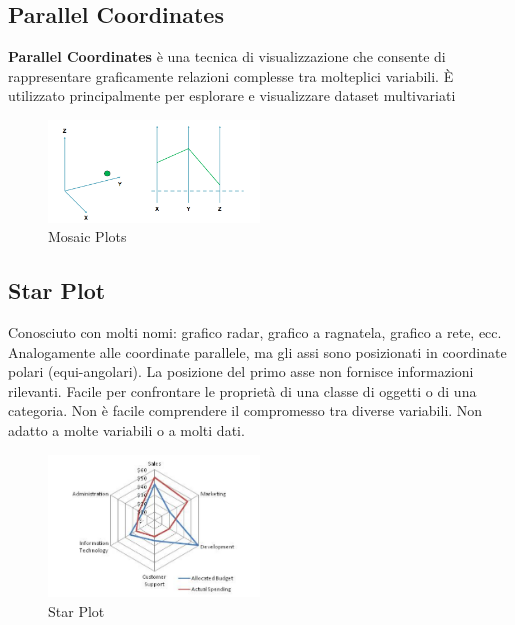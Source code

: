 \subsection{Parallel Coordinates}


\textbf{Parallel Coordinates} è una tecnica di visualizzazione che consente di rappresentare graficamente relazioni complesse tra molteplici variabili. È utilizzato principalmente per esplorare e visualizzare dataset multivariati
\begin{figure}[H]
  \centering
  \includegraphics[width=0.5\textwidth]{images/Parallelcord.png} 
  \caption{Mosaic Plots}
  \label{fig:immagine}
\end{figure}
\subsection{Star Plot}
Conosciuto con molti nomi: grafico radar, grafico a ragnatela, grafico a rete, ecc.
Analogamente alle coordinate parallele, ma gli assi sono posizionati in coordinate polari (equi-angolari).
La posizione del primo asse non fornisce informazioni rilevanti.
Facile per confrontare le proprietà di una classe di oggetti o di una categoria.
Non è facile comprendere il compromesso tra diverse variabili.
Non adatto a molte variabili o a molti dati.
\begin{figure}[H]
  \centering
  \includegraphics[width=0.5\textwidth]{images/Starplot.png} 
  \caption{Star Plot}
  \label{fig:immagine}
\end{figure}